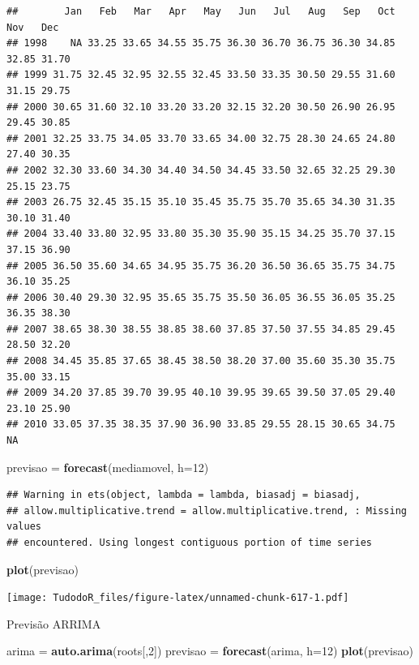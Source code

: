 \documentclass[
]{book}
\newenvironment{Shaded}{\begin{snugshade}}{\end{snugshade}}
\newcommand{\DataTypeTok}[1]{\textcolor[rgb]{0.13,0.29,0.53}{#1}}
\newcommand{\DecValTok}[1]{\textcolor[rgb]{0.00,0.00,0.81}{#1}}
\newcommand{\KeywordTok}[1]{\textcolor[rgb]{0.13,0.29,0.53}{\textbf{#1}}}
\newcommand{\NormalTok}[1]{#1}
\newcommand{\StringTok}[1]{\textcolor[rgb]{0.31,0.60,0.02}{#1}}
\begin{document}
\begin{verbatim}
##        Jan   Feb   Mar   Apr   May   Jun   Jul   Aug   Sep   Oct   Nov   Dec
## 1998    NA 33.25 33.65 34.55 35.75 36.30 36.70 36.75 36.30 34.85 32.85 31.70
## 1999 31.75 32.45 32.95 32.55 32.45 33.50 33.35 30.50 29.55 31.60 31.15 29.75
## 2000 30.65 31.60 32.10 33.20 33.20 32.15 32.20 30.50 26.90 26.95 29.45 30.85
## 2001 32.25 33.75 34.05 33.70 33.65 34.00 32.75 28.30 24.65 24.80 27.40 30.35
## 2002 32.30 33.60 34.30 34.40 34.50 34.45 33.50 32.65 32.25 29.30 25.15 23.75
## 2003 26.75 32.45 35.15 35.10 35.45 35.75 35.70 35.65 34.30 31.35 30.10 31.40
## 2004 33.40 33.80 32.95 33.80 35.30 35.90 35.15 34.25 35.70 37.15 37.15 36.90
## 2005 36.50 35.60 34.65 34.95 35.75 36.20 36.50 36.65 35.75 34.75 36.10 35.25
## 2006 30.40 29.30 32.95 35.65 35.75 35.50 36.05 36.55 36.05 35.25 36.35 38.30
## 2007 38.65 38.30 38.55 38.85 38.60 37.85 37.50 37.55 34.85 29.45 28.50 32.20
## 2008 34.45 35.85 37.65 38.45 38.50 38.20 37.00 35.60 35.30 35.75 35.00 33.15
## 2009 34.20 37.85 39.70 39.95 40.10 39.95 39.65 39.50 37.05 29.40 23.10 25.90
## 2010 33.05 37.35 38.35 37.90 36.90 33.85 29.55 28.15 30.65 34.75    NA
\end{verbatim}

\begin{Shaded}
\begin{Highlighting}[]
\NormalTok{previsao =}\StringTok{ }\KeywordTok{forecast}\NormalTok{(mediamovel, }\DataTypeTok{h=}\DecValTok{12}\NormalTok{)}
\end{Highlighting}
\end{Shaded}

\begin{verbatim}
## Warning in ets(object, lambda = lambda, biasadj = biasadj,
## allow.multiplicative.trend = allow.multiplicative.trend, : Missing values
## encountered. Using longest contiguous portion of time series
\end{verbatim}

\begin{Shaded}
\begin{Highlighting}[]
\KeywordTok{plot}\NormalTok{(previsao)}
\end{Highlighting}
\end{Shaded}

\texttt{[image: TudodoR\_files/figure-latex/unnamed-chunk-617-1.pdf]}

Previsão ARRIMA

\begin{Shaded}
\begin{Highlighting}[]
\NormalTok{arima =}\StringTok{ }\KeywordTok{auto.arima}\NormalTok{(roots[,}\DecValTok{2}\NormalTok{])}
\NormalTok{previsao =}\StringTok{ }\KeywordTok{forecast}\NormalTok{(arima, }\DataTypeTok{h=}\DecValTok{12}\NormalTok{)}
\KeywordTok{plot}\NormalTok{(previsao)}
\end{Highlighting}
\end{Shaded}
\end{document}
